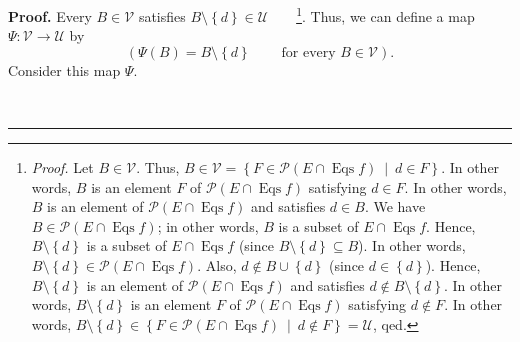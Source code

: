 \documentclass[numbers=enddot,12pt,final,onecolumn,notitlepage]{scrartcl}%
\theoremstyle{definition}
\newenvironment{proof}[1][Proof]{\noindent\textbf{#1.} }{\ \rule{0.5em}{0.5em}}
\newenvironment{verlong}{}{}
\begin{document}
\begin{verlong}
\begin{proof}
Every $B\in\mathcal{V}$ satisfies $B\setminus\left\{  d\right\}
\in\mathcal{U}$\ \ \ \ \footnote{\textit{Proof.} Let $B\in\mathcal{V}$. Thus,
$B\in\mathcal{V}=\left\{  F\in\mathcal{P}\left(  E\cap\operatorname*{Eqs}%
f\right)  \ \mid\ d\in F\right\}  $. In other words, $B$ is an element $F$ of
$\mathcal{P}\left(  E\cap\operatorname*{Eqs}f\right)  $ satisfying $d\in F$.
In other words, $B$ is an element of $\mathcal{P}\left(  E\cap
\operatorname*{Eqs}f\right)  $ and satisfies $d\in B$. We have $B\in
\mathcal{P}\left(  E\cap\operatorname*{Eqs}f\right)  $; in other words, $B$ is
a subset of $E\cap\operatorname*{Eqs}f$. Hence, $B\setminus\left\{  d\right\}
$ is a subset of $E\cap\operatorname*{Eqs}f$ (since $B\setminus\left\{
d\right\}  \subseteq B$). In other words, $B\setminus\left\{  d\right\}
\in\mathcal{P}\left(  E\cap\operatorname*{Eqs}f\right)  $. Also, $d\notin
B\cup\left\{  d\right\}  $ (since $d\in\left\{  d\right\}  $). Hence,
$B\setminus\left\{  d\right\}  $ is an element of $\mathcal{P}\left(
E\cap\operatorname*{Eqs}f\right)  $ and satisfies $d\notin B\setminus\left\{
d\right\}  $. In other words, $B\setminus\left\{  d\right\}  $ is an element
$F$ of $\mathcal{P}\left(  E\cap\operatorname*{Eqs}f\right)  $ satisfying
$d\notin F$. In other words, $B\setminus\left\{  d\right\}  \in\left\{
F\in\mathcal{P}\left(  E\cap\operatorname*{Eqs}f\right)  \ \mid\ d\notin
F\right\}  =\mathcal{U}$, qed.}. Thus, we can define a map $\Psi
:\mathcal{V}\rightarrow\mathcal{U}$ by%
\[
\left(  \Psi\left(  B\right)  =B\setminus\left\{  d\right\}
\ \ \ \ \ \ \ \ \ \ \text{for every }B\in\mathcal{V}\right)  .
\]
Consider this map $\Psi$.


\end{proof}
\end{verlong}
\end{document}
